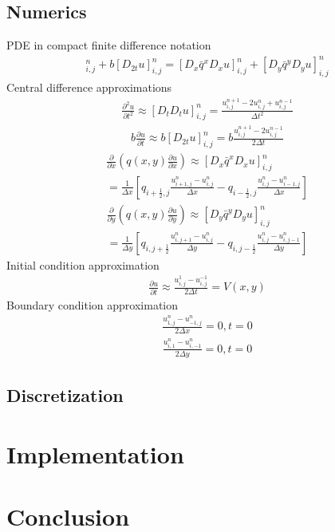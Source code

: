 \documentclass[11pt]{article}
\begin{document}
		\subsection{Numerics}
		PDE in compact finite difference notation
		\begin{align*}
		[D_tD_{t}u]^n_{i,j} + b[D_{2t}u]^n_{i,j} 
		= [D_{x}\bar{q}^{x} D_{x}u]^n_{i,j} 
		+ [D_{y}\bar{q}^{y} D_{y}u]^n_{i,j}
		\end{align*}
		Central difference approximations
		\begin{align*}
		\frac{\partial^2 u}{\partial t^2} 
		\approx [D_tD_{t}u]^n_{i,j}
		= \frac{u^{n+1}_{i,j} - 2u^{n}_{i,j}
		+ u^{n-1}_{i,j}}{\Delta t^2}
		\end{align*}
		\begin{align*}
		b\frac{\partial u}{\partial t}
		\approx b[D_{2t}u]^n_{i,j}
		= b\frac{u^{n+1}_{i,j} - 2u^{n-1}_{i,j}}
		{2\Delta t}
		\end{align*}
		\begin{align*}
		\frac{\partial}{\partial x} 
		\left(q(x,y)\frac{\partial u}{\partial x}
		\right)
		\approx [D_{x}\bar{q}^{x} D_{x}u]^n_{i,j} 
		\\ =\frac{1}{\Delta x}
		\left[q_{i+\frac{1}{2},j}
		\frac{u^{n}_{i+1,j}-u^{n}_{i,j}}{\Delta x}
		-q_{i-\frac{1}{2},j}
		\frac{u^{n}_{i,j}-u^{n}_{i-1,j}}{\Delta x}\right]
		\end{align*}
		\begin{align*}
		\frac{\partial}{\partial y} 
		\left(q(x,y)\frac{\partial u}{\partial y}
		\right)
		\approx [D_{y}\bar{q}^{y} D_{y}u]^n_{i,j} 
		\\ =\frac{1}{\Delta y}
		\left[q_{i,j+\frac{1}{2}}
		\frac{u^{n}_{i,j+1}-u^{n}_{i,j}}{\Delta y}
		-q_{i,j-\frac{1}{2}}
		\frac{u^{n}_{i,j}-u^{n}_{i,j-1}}{\Delta y}\right]
		\end{align*}
		Initial condition approximation
		\begin{align*}
		\frac{\partial u}{\partial t}
		\approx \frac{u^1_{i,j}-u^{-1}_{i,j}}{2\Delta t} 
		 = V(x,y)
		\end{align*}
		Boundary condition approximation
		\begin{align*}		
		\frac{u^n_{1,j}-u^n_{-1,j}}{2\Delta x} = 0, t = 0	
		\end{align*}
		\begin{align*}		
		\frac{u^n_{i,1}-u^n_{i,-1}}{2\Delta y} = 0, t = 0	
		\end{align*}
		\subsection{Discretization}
		
	\section{Implementation}
	
	\section{Conclusion}
\end{document}

